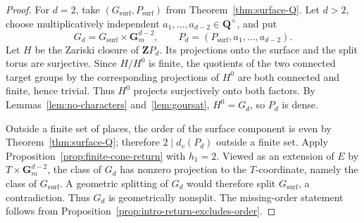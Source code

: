 \documentclass[11pt,letterpaper,reqno]{amsart}
\theoremstyle{definition}
\theoremstyle{remark}
\newcommand{\Gm}{\mathbf G_m}
\newcommand{\Q}{\mathbf Q}
\begin{document}
\begin{proof}
For $d=2$, take $(G_{\mathrm{surf}},P_{\mathrm{surf}})$ from
Theorem~\ref{thm:surface-Q}.  Let $d>2$, choose multiplicatively independent
$a_1,\ldots,a_{d-2}\in\Q^\times$, and put
\[
 G_d=G_{\mathrm{surf}}\times\Gm^{d-2},
 \qquad
 P_d=(P_{\mathrm{surf}},a_1,\ldots,a_{d-2}).
\]
Let $H$ be the Zariski closure of $\mathbf ZP_d$.  Its projections onto the
surface and the split torus are surjective.  Since $H/H^0$ is finite, the
quotients of the two connected target groups by the corresponding projections
of $H^0$ are both connected and finite, hence trivial.  Thus $H^0$ projects
surjectively onto both factors.  By
Lemmas~\ref{lem:no-characters} and~\ref{lem:goursat}, $H^0=G_d$, so $P_d$ is dense.

Outside a finite set of places, the order of the surface component is even by
Theorem~\ref{thm:surface-Q}; therefore $2\mid d_v(P_d)$ outside a finite set.
Apply Proposition~\ref{prop:finite-cone-return} with $h_1=2$.  Viewed as an extension
of $E$ by $T\times\Gm^{d-2}$, the class of $G_d$ has nonzero projection to the
$T$-coordinate, namely the class of $G_{\mathrm{surf}}$.  A geometric splitting
of $G_d$ would therefore split $G_{\mathrm{surf}}$, a contradiction.  Thus
$G_d$ is geometrically nonsplit.  The missing-order statement follows from
Proposition~\ref{prop:intro-return-excludes-order}.
\end{proof}



\end{document}
